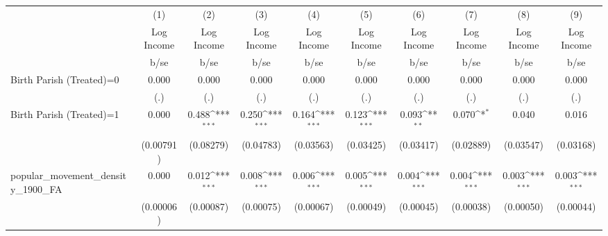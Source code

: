 {
\def\sym#1{\ifmmode^{#1}\else\(^{#1}\)\fi}
\begin{tabular}{l*{9}{c}}
\hline\hline
                    &\multicolumn{1}{c}{(1)}&\multicolumn{1}{c}{(2)}&\multicolumn{1}{c}{(3)}&\multicolumn{1}{c}{(4)}&\multicolumn{1}{c}{(5)}&\multicolumn{1}{c}{(6)}&\multicolumn{1}{c}{(7)}&\multicolumn{1}{c}{(8)}&\multicolumn{1}{c}{(9)}\\
                    &\multicolumn{1}{c}{Log Income}&\multicolumn{1}{c}{Log Income}&\multicolumn{1}{c}{Log Income}&\multicolumn{1}{c}{Log Income}&\multicolumn{1}{c}{Log Income}&\multicolumn{1}{c}{Log Income}&\multicolumn{1}{c}{Log Income}&\multicolumn{1}{c}{Log Income}&\multicolumn{1}{c}{Log Income}\\
                    &        b/se         &        b/se         &        b/se         &        b/se         &        b/se         &        b/se         &        b/se         &        b/se         &        b/se         \\
\hline
Birth Parish (Treated)=0&       0.000         &       0.000         &       0.000         &       0.000         &       0.000         &       0.000         &       0.000         &       0.000         &       0.000         \\
                    &         (.)         &         (.)         &         (.)         &         (.)         &         (.)         &         (.)         &         (.)         &         (.)         &         (.)         \\
Birth Parish (Treated)=1&       0.000         &       0.488\sym{***}&       0.250\sym{***}&       0.164\sym{***}&       0.123\sym{***}&       0.093\sym{**} &       0.070\sym{*}  &       0.040         &       0.016         \\
                    &   (0.00791)         &   (0.08279)         &   (0.04783)         &   (0.03563)         &   (0.03425)         &   (0.03417)         &   (0.02889)         &   (0.03547)         &   (0.03168)         \\
popular\_movement\_density\_1900\_FA&       0.000         &       0.012\sym{***}&       0.008\sym{***}&       0.006\sym{***}&       0.005\sym{***}&       0.004\sym{***}&       0.004\sym{***}&       0.003\sym{***}&       0.003\sym{***}\\
                    &   (0.00006)         &   (0.00087)         &   (0.00075)         &   (0.00067)         &   (0.00049)         &   (0.00045)         &   (0.00038)         &   (0.00050)         &   (0.00044)         \\

\end{tabular}}
